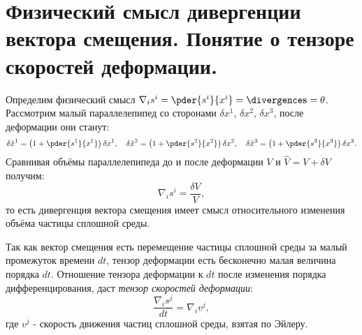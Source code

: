 \chapter{Физический смысл дивергенции вектора смещения. Понятие о тензоре
скоростей деформации.}
Определим физический смысл \( \nabla_is^i = \pder{s^i}{x^i} = \divergence\vec{s} =
\theta \). Рассмотрим малый параллелепипед со сторонами \( \delta x^1 \),
\( \delta x^2 \), \( \delta x^3 \), после деформации они станут:
\[
	\delta\hat{x}^1 = \left(1 + \pder{s^1}{x^1}\right)\delta x^1,\quad
	\delta\hat{x}^2 = \left(1 + \pder{s^2}{x^2}\right)\delta x^2,\quad
	\delta\hat{x}^3 = \left(1 + \pder{s^3}{x^3}\right)\delta x^3.
\]
Сравнивая объёмы параллелепипеда до и после деформации \( V \) и
\( \hat{V} = V + \delta V \) получим:
\[
	\nabla_is^i = \frac{\delta V}{V},
\]
то есть дивергенция вектора смещения имеет смысл относительного изменения
объёма частицы сплошной среды.

Так как вектор смещения есть перемещение частицы сплошной среды за малый
промежуток времени \( dt \), тензор деформации есть бесконечно малая величина
порядка \( dt \). Отношение тензора деформации к \( dt \) после изменения
порядка дифференцирования, даст \emph{тензор скоростей деформации}:
\[
	\frac{\nabla_is^j}{dt} = \nabla_iv^j,
\]
где \( v^j \) - скорость движения частиц сплошной среды, взятая по Эйлеру.
\newpage
